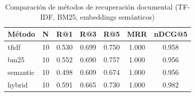 \begin{table}[htbp]
\centering
\caption{Comparación de métodos de recuperación documental (TF-IDF, BM25, embeddings semánticos)}
\begin{tabular}{lcccccc}
\toprule
Método & N & R@1 & R@3 & R@5 & MRR & nDCG@5 \\
\midrule
tfidf & 10 & 0.530 & 0.699 & 0.750 & 1.000 & 0.958 \\
bm25 & 10 & 0.552 & 0.690 & 0.757 & 1.000 & 0.956 \\
semantic & 10 & 0.498 & 0.609 & 0.674 & 1.000 & 0.956 \\
hybrid & 10 & 0.591 & 0.665 & 0.730 & 1.000 & 0.982 \\
\bottomrule
\end{tabular}

\label{tab:rag-retrieval-comparison}
\end{table}
